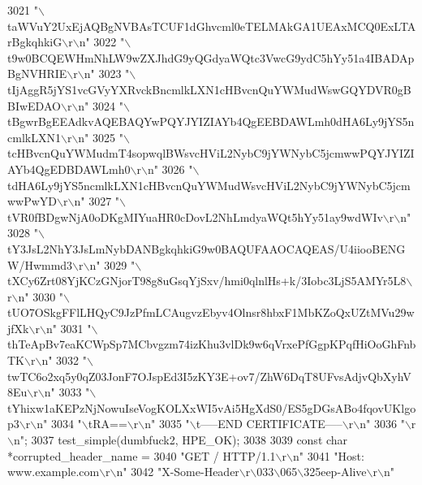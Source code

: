 \begin{DoxyCode}
{{{3021     \textcolor{stringliteral}{"\(\backslash\)taWVuY2UxEjAQBgNVBAsTCUF1dGhvcml0eTELMAkGA1UEAxMCQ0ExLTArBgkqhkiG\(\backslash\)r\(\backslash\)n"}
3022     \textcolor{stringliteral}{"\(\backslash\)t9w0BCQEWHmNhLW9wZXJhdG9yQGdyaWQtc3VwcG9ydC5hYy51a4IBADApBgNVHRIE\(\backslash\)r\(\backslash\)n"}
3023     \textcolor{stringliteral}{"\(\backslash\)tIjAggR5jYS1vcGVyYXRvckBncmlkLXN1cHBvcnQuYWMudWswGQYDVR0gBBIwEDAO\(\backslash\)r\(\backslash\)n"}
3024     \textcolor{stringliteral}{"\(\backslash\)tBgwrBgEEAdkvAQEBAQYwPQYJYIZIAYb4QgEEBDAWLmh0dHA6Ly9jYS5ncmlkLXN1\(\backslash\)r\(\backslash\)n"}
3025     \textcolor{stringliteral}{"\(\backslash\)tcHBvcnQuYWMudmT4sopwqlBWsvcHViL2NybC9jYWNybC5jcmwwPQYJYIZIAYb4QgEDBDAWLmh0\(\backslash\)r\(\backslash\)n"}
3026     \textcolor{stringliteral}{"\(\backslash\)tdHA6Ly9jYS5ncmlkLXN1cHBvcnQuYWMudWsvcHViL2NybC9jYWNybC5jcmwwPwYD\(\backslash\)r\(\backslash\)n"}
3027     \textcolor{stringliteral}{"\(\backslash\)tVR0fBDgwNjA0oDKgMIYuaHR0cDovL2NhLmdyaWQt5hYy51ay9wdWIv\(\backslash\)r\(\backslash\)n"}
3028     \textcolor{stringliteral}{"\(\backslash\)tY3JsL2NhY3JsLmNybDANBgkqhkiG9w0BAQUFAAOCAQEAS/U4iiooBENGW/Hwmmd3\(\backslash\)r\(\backslash\)n"}
3029     \textcolor{stringliteral}{"\(\backslash\)tXCy6Zrt08YjKCzGNjorT98g8uGsqYjSxv/hmi0qlnlHs+k/3Iobc3LjS5AMYr5L8\(\backslash\)r\(\backslash\)n"}
3030     \textcolor{stringliteral}{"\(\backslash\)tUO7OSkgFFlLHQyC9JzPfmLCAugvzEbyv4Olnsr8hbxF1MbKZoQxUZtMVu29wjfXk\(\backslash\)r\(\backslash\)n"}
3031     \textcolor{stringliteral}{"\(\backslash\)thTeApBv7eaKCWpSp7MCbvgzm74izKhu3vlDk9w6qVrxePfGgpKPqfHiOoGhFnbTK\(\backslash\)r\(\backslash\)n"}
3032     \textcolor{stringliteral}{"\(\backslash\)twTC6o2xq5y0qZ03JonF7OJspEd3I5zKY3E+ov7/ZhW6DqT8UFvsAdjvQbXyhV8Eu\(\backslash\)r\(\backslash\)n"}
3033     \textcolor{stringliteral}{"\(\backslash\)tYhixw1aKEPzNjNowuIseVogKOLXxWI5vAi5HgXdS0/ES5gDGsABo4fqovUKlgop3\(\backslash\)r\(\backslash\)n"}
3034     \textcolor{stringliteral}{"\(\backslash\)tRA==\(\backslash\)r\(\backslash\)n"}
3035     \textcolor{stringliteral}{"\(\backslash\)t-----END CERTIFICATE-----\(\backslash\)r\(\backslash\)n"}
3036     \textcolor{stringliteral}{"\(\backslash\)r\(\backslash\)n"};
3037   test_simple(dumbfuck2, HPE_OK);
3038 
3039   \textcolor{keyword}{const} \textcolor{keywordtype}{char} *corrupted\_header\_name =
3040     \textcolor{stringliteral}{"GET / HTTP/1.1\(\backslash\)r\(\backslash\)n"}
3041     \textcolor{stringliteral}{"Host: www.example.com\(\backslash\)r\(\backslash\)n"}
3042     \textcolor{stringliteral}{"X-Some-Header\(\backslash\)r\(\backslash\)033\(\backslash\)065\(\backslash\)325eep-Alive\(\backslash\)r\(\backslash\)n"}
}}}
\end{DoxyCode}
